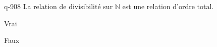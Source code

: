\begin{truefalse}{q-908}
La relation de divisibilité sur $\mathbb N$ est une relation d'ordre total.
\item Vrai
\item* Faux
\end{truefalse}

